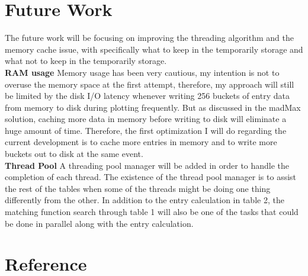 \documentclass[sigconf, nonacm, natbib=false]{acmart}
\begin{document}
\section{Future Work}
The future work will be focusing on improving the threading algorithm and the memory cache issue, with specifically what to keep in the temporarily storage and what not to keep in the temporarily storage. \\
{\bf RAM usage} 
Memory usage has been very cautious, my intention is not to overuse the memory space at the first attempt, therefore, my approach will still be limited by the disk I/O latency whenever writing 256 buckets of entry data from memory to disk during plotting frequently. But as discussed in the madMax solution, caching more data in memory before writing to disk will eliminate a huge amount of time. Therefore, the first optimization I will do regarding the current development is to cache more entries in memory and to write more buckets out to disk at the same event. \\
{\bf Thread Pool}
A threading pool manager will be added in order to handle the completion of each thread. The existence of the thread pool manager is to assist the rest of the tables when some of the threads might be doing one thing differently from the other. In addition to the entry calculation in table 2, the matching function search through table 1 will also be one of the tasks that could be done in parallel along with the entry calculation. 
\section{Reference}
\printbibliography[heading=none]
\end{document}
